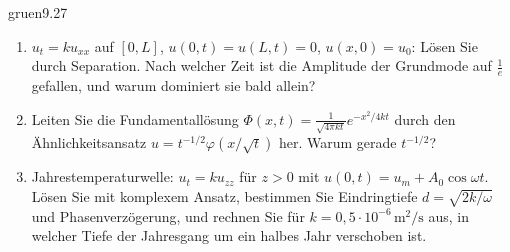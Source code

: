 \begin{karte}{gruen}{9.27}{\typwerk}{}
\begin{enumerate}[label=(\alph*),leftmargin=1.6em,itemsep=2pt]
\item $u_t = ku_{xx}$ auf $[0, L]$, $u(0, t) = u(L, t) = 0$, $u(x, 0) = u_0$: Lösen Sie durch Separation. Nach welcher Zeit ist die Amplitude der Grundmode auf $\frac1e$ gefallen, und warum dominiert sie bald allein?
\item Leiten Sie die Fundamentallösung $\Phi(x, t) = \frac1{\sqrt{4\pi kt}}e^{-x^{2}/4kt}$ durch den Ähnlichkeitsansatz $u = t^{-1/2}\varphi(x/\sqrt t)$ her. Warum gerade $t^{-1/2}$?
\item Jahrestemperaturwelle: $u_t = ku_{zz}$ für $z > 0$ mit $u(0, t) = u_m + A_0\cos\omega t$. Lösen Sie mit komplexem Ansatz, bestimmen Sie Eindringtiefe $d = \sqrt{2k/\omega}$ und Phasenverzögerung, und rechnen Sie für $k = 0{,}5\cdot10^{-6}\,\mathrm{m^{2}/s}$ aus, in welcher Tiefe der Jahresgang um ein halbes Jahr verschoben ist.
\end{enumerate}
\end{karte}

